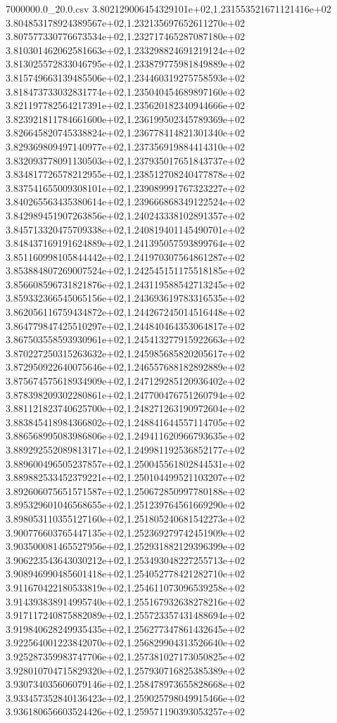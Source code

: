 \begin{filecontents*}{7000000.0_20.0.csv}
3.802129006454329101e+02,1.231553521671121416e+02
3.804853178924389567e+02,1.232135697652611270e+02
3.807577330776673534e+02,1.232717465287087180e+02
3.810301462062581663e+02,1.233298824691219124e+02
3.813025572833046795e+02,1.233879775981849889e+02
3.815749663139485506e+02,1.234460319275758593e+02
3.818473733032831774e+02,1.235040454689897160e+02
3.821197782564217391e+02,1.235620182340944666e+02
3.823921811784661600e+02,1.236199502345789369e+02
3.826645820745338824e+02,1.236778414821301340e+02
3.829369809497140977e+02,1.237356919884414310e+02
3.832093778091130503e+02,1.237935017651843737e+02
3.834817726578212955e+02,1.238512708240477878e+02
3.837541655009308101e+02,1.239089991767323227e+02
3.840265563435380614e+02,1.239666868349122524e+02
3.842989451907263856e+02,1.240243338102891357e+02
3.845713320475709338e+02,1.240819401145490701e+02
3.848437169191624889e+02,1.241395057593899764e+02
3.851160998105844442e+02,1.241970307564861287e+02
3.853884807269007524e+02,1.242545151175518185e+02
3.856608596731821876e+02,1.243119588542713245e+02
3.859332366545065156e+02,1.243693619783316535e+02
3.862056116759434872e+02,1.244267245014516448e+02
3.864779847425510297e+02,1.244840464353064817e+02
3.867503558593930961e+02,1.245413277915922663e+02
3.870227250315263632e+02,1.245985685820205617e+02
3.872950922640075646e+02,1.246557688182892889e+02
3.875674575618934909e+02,1.247129285120936402e+02
3.878398209302280861e+02,1.247700476751260794e+02
3.881121823740625700e+02,1.248271263190972604e+02
3.883845418984366802e+02,1.248841644557114705e+02
3.886568995083986806e+02,1.249411620966793635e+02
3.889292552089813171e+02,1.249981192536852177e+02
3.889600496505237857e+02,1.250045561802844531e+02
3.889882533452379221e+02,1.250104499521103207e+02
3.892606075651571587e+02,1.250672850997780188e+02
3.895329601046568655e+02,1.251239764561669290e+02
3.898053110355127160e+02,1.251805240681542273e+02
3.900776603765447135e+02,1.252369279742451909e+02
3.903500081465527956e+02,1.252931882129396399e+02
3.906223543643030212e+02,1.253493048227255713e+02
3.908946990485601418e+02,1.254052778421282710e+02
3.911670422180533819e+02,1.254611073096539258e+02
3.914393838914995740e+02,1.255167932638278216e+02
3.917117240875882089e+02,1.255723357431488694e+02
3.919840628249935435e+02,1.256277347861432645e+02
3.922564001223842070e+02,1.256829904313526640e+02
3.925287359983747706e+02,1.257381027173050825e+02
3.928010704715829320e+02,1.257930716825385389e+02
3.930734035606079146e+02,1.258478973655828668e+02
3.933457352840136423e+02,1.259025798049915466e+02
3.936180656603524426e+02,1.259571190393053257e+02

\end{filecontents*}
